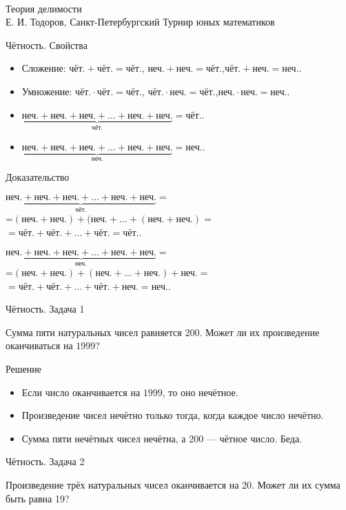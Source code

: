 \documentclass[17pt]{extarticle}
\newcommand{\newslide}[1]{\newpage \begin{center} \large #1 \end{center}}
\newcommand{\che}{\text{чёт.}}
\newcommand{\nech}{\text{неч.}}
\newcommand{\lb}{\linebreak}
\begin{document}
\ \\ [1cm]

\begin{center} {\Large Теория делимости} \bigskip \\
{\large Е. И. Тодоров, Санкт-Петербургский Турнир юных математиков} \end{center}

\newslide{Чётность. Свойства}

\begin{itemize}\itemsep = 0mm
\item Сложение: $\che + \che = \che$, $\nech+\nech = \che$,\lb $\che + \nech = \nech$.
\item Умножение: $\che\cdot\che = \che$, $\che\cdot\nech = \che$,\lb $\nech\cdot\nech = \nech$.
\item $\underbrace{\nech+\nech+\nech+\ldots+\nech+\nech}_{\che} = \che$.
\item $\underbrace{\nech+\nech+\nech+\ldots+\nech+\nech}_{\nech} = \nech$.
\end{itemize}

\newslide{Доказательство} %

$\underbrace{\nech+\nech+\nech+\ldots+\nech+\nech}_{\che} =$\\
=$(\nech+\nech)+(\nech+\ldots+(\nech+\nech)=$\\
$= \che+\che+\ldots+\che = \che$.

$\underbrace{\nech+\nech+\nech+\ldots+\nech+\nech}_{\nech} =$\\
=$(\nech+\nech)+(\nech+\ldots+\nech)+\nech=$\\
$= \che+\che+\ldots+\che+\nech = \nech$.

\newslide{Чётность. Задача 1}

Сумма пяти натуральных чисел равняется $200$. Может ли их произведение оканчиваться на $1999$?

\newslide{Решение}

\begin{itemize}
\item Если число оканчивается на $1999$, то оно нечётное.
\item Произведение чисел нечётно только тогда, когда каждое число нечётно.
\item Сумма пяти нечётных чисел нечётна, а 200 --- чётное число. Беда.
\end{itemize}

\newslide{Чётность. Задача 2}

Произведение трёх натуральных чисел оканчивается на 20. Может ли их сумма быть равна 19?
\end{document}

